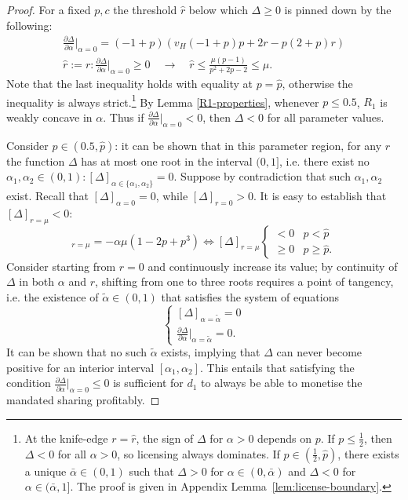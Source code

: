 \begin{proof}
    For a fixed $p,c$ the threshold $\hat{r}$ below which $\Delta \geq 0$ is pinned down by the following:
    \begin{align*}
    \frac{\partial \Delta}{\partial \alpha} \bigg|_{\alpha = 0} = (-1 + p) (v_H (-1 + p) p + 2 r - p (2 + p) r) \\[5pt]
    \hat{r}:=r: \frac{\partial \Delta}{\partial \alpha} \bigg|_{\alpha = 0} \geq 0 \quad \to \quad \hat{r} \leq  \frac{\mu (p-1)}{p^2 + 2 p -2} \leq \mu.
\end{align*}
Note that the last inequality holds with equality at $p = \hat{p}$, otherwise the inequality is always strict.\footnote{At the knife-edge $r = \hat{r}$, the sign of $\Delta$ for $\alpha > 0$ depends on $p$. If $p \leq \frac{1}{2}$, then $\Delta < 0$ for all $\alpha > 0$, so licensing always dominates. If $p \in \left(\frac{1}{2}, \hat{p}\right)$, there exists a unique $\bar{\alpha} \in (0,1)$ such that $\Delta > 0$ for $\alpha \in (0,\bar{\alpha})$ and $\Delta < 0$ for $\alpha \in (\bar{\alpha},1]$. The proof is given in Appendix Lemma~\ref{lem:license-boundary}.} By Lemma \ref{R1-properties}, whenever $p \leq 0.5$, $R_1$ is weakly concave in $\alpha$. Thus if $\frac{\partial \Delta}{\partial \alpha} \big|_{\alpha = 0}<0$, then $\Delta<0$ for all parameter values. \par
\noindent Consider $p \in (0.5, \hat{p})$: it can be shown that in this parameter region, for any $r$ the function $\Delta$ has at most one root in the interval $(0, 1]$, i.e. there exist no $ \alpha_1,\alpha_2 \in (0,1) : [\Delta]_{\alpha \in \{\alpha_1,\alpha_2\}} = 0$. Suppose by contradiction that such $\alpha_1,\alpha_2$ exist. Recall that $[\Delta]_{\alpha = 0}=0$, while $[\Delta]_{r = 0}>0$. It is easy to establish that $[\Delta]_{r = \mu}<0$:
\begin{equation*}
    [\Delta]_{r=\mu} = -\alpha \mu (1 - 2 p + p^3) \iff [\Delta]_{r=\mu} \begin{cases}
        < 0 & p < \hat{p} \\
        \geq 0 & p \geq \hat{p}.
    \end{cases}
\end{equation*}
Consider starting from $r = 0$ and continuously increase its value; by continuity of $\Delta$ in both $\alpha$ and $r$, shifting from one to three roots requires a point of tangency, i.e. the existence of $ \tilde{\alpha} \in (0,1)$ that satisfies the system of equations
\begin{equation*}
    \begin{cases}
        [\Delta]_{\alpha = \tilde{\alpha}}= 0\\[5pt]
        \frac{\partial \Delta}{\partial \alpha}\big|_{\alpha = \tilde{\alpha}}=0.
    \end{cases}
\end{equation*}
It can be shown that no such $\tilde{\alpha}$ exists, implying that $\Delta$ can never become positive for an interior interval $[\alpha_1,\alpha_2]$. This entails that satisfying the condition $\frac{\partial \Delta}{\partial \alpha} |_{\alpha = 0} \leq 0 $ is sufficient for $d_1$ to always be able to monetise the mandated sharing profitably.
\end{proof}

